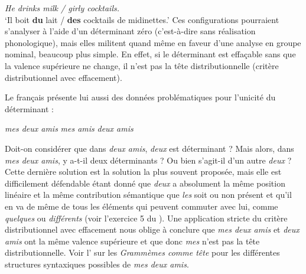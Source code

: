 \ea
\textit{{He drinks milk / girly cocktails.}}\\
\glt ‘Il boit \textbf{du} lait / \textbf{des} cocktails de midinettes.’
\z
Ces configurations pourraient s’analyser à l’aide d’un déterminant zéro (c’est-à-dire sans réalisation phonologique), mais elles militent quand même en faveur d’une analyse en groupe nominal, beaucoup plus simple. En effet, si le déterminant est effaçable sans que la valence supérieure ne change, il n’est pas la tête distributionnelle (critère distributionnel avec effacement).

Le français présente lui aussi des données problématiques pour l’unicité du déterminant :

\ea
  \ea \textit{mes deux amis}
  \ex \textit{mes amis}
  \ex \textit{deux amis}
  \z
\z

Doit-on considérer que dans \textit{deux amis}, \textit{deux} est déterminant ? Mais alors, dans \textit{mes deux amis}, y a-t-il deux déterminants ? Ou bien s’agit-il d’un autre \textit{deux} ? Cette dernière solution est la solution la plus souvent proposée, mais elle est difficilement défendable étant donné que \textit{deux} a absolument la même position linéaire et la même contribution sémantique que \textit{les} soit ou non présent et qu’il en va de même de tous les éléments qui peuvent commuter avec lui, comme \textit{quelques} ou \textit{différents} (voir l’exercice 5 du ). Une application stricte du critère distributionnel avec effacement nous oblige à conclure que \textit{mes deux amis} et \textit{deux amis} ont la même valence supérieure et que donc \textit{mes} n’est pas la tête distributionnelle. Voir l’ sur les \textit{Grammèmes comme tête} pour les différentes structures syntaxiques possibles de \textit{mes deux amis}.

